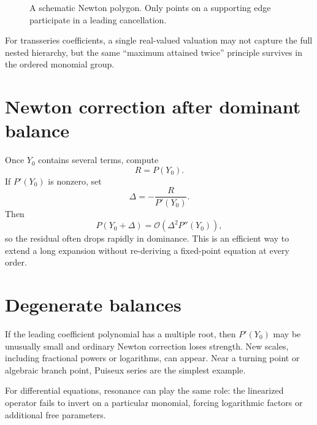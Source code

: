 \documentclass[11pt,openany]{book}
\theoremstyle{definition}
\theoremstyle{plain}
\theoremstyle{remark}
\newcommand{\bigO}{\mathcal{O}}
\begin{document}
\begin{figure}[htbp]
\centering
{}
\caption{A schematic Newton polygon. Only points on a supporting edge participate in a leading cancellation.}
\label{fig:newton-polygon}
\end{figure}

For transseries coefficients, a single real-valued valuation may not capture the full nested hierarchy, but the same ``maximum attained twice'' principle survives in the ordered monomial group.

\section{Newton correction after dominant balance}

Once $Y_0$ contains several terms, compute
\[
 R=P(Y_0).
\]
If $P'(Y_0)$ is nonzero, set
\[
 \Delta=-\frac{R}{P'(Y_0)}.
\]
Then
\[
 P(Y_0+\Delta)=\bigO(\Delta^2P''(Y_0)),
\]
so the residual often drops rapidly in dominance. This is an efficient way to extend a long expansion without re-deriving a fixed-point equation at every order.

\section{Degenerate balances}

If the leading coefficient polynomial has a multiple root, then $P'(Y_0)$ may be unusually small and ordinary Newton correction loses strength. New scales, including fractional powers or logarithms, can appear. Near a turning point or algebraic branch point, Puiseux series are the simplest example.

For differential equations, resonance can play the same role: the linearized operator fails to invert on a particular monomial, forcing logarithmic factors or additional free parameters.
\end{document}
